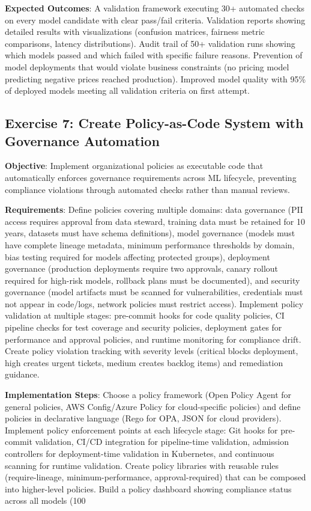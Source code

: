 \textbf{Expected Outcomes}: A validation framework executing 30+ automated checks on every model candidate with clear pass/fail criteria. Validation reports showing detailed results with visualizations (confusion matrices, fairness metric comparisons, latency distributions). Audit trail of 50+ validation runs showing which models passed and which failed with specific failure reasons. Prevention of model deployments that would violate business constraints (no pricing model predicting negative prices reached production). Improved model quality with 95\% of deployed models meeting all validation criteria on first attempt.

\subsection{Exercise 7: Create Policy-as-Code System with Governance Automation}

\textbf{Objective}: Implement organizational policies as executable code that automatically enforces governance requirements across ML lifecycle, preventing compliance violations through automated checks rather than manual reviews.

\textbf{Requirements}: Define policies covering multiple domains: data governance (PII access requires approval from data steward, training data must be retained for 10 years, datasets must have schema definitions), model governance (models must have complete lineage metadata, minimum performance thresholds by domain, bias testing required for models affecting protected groups), deployment governance (production deployments require two approvals, canary rollout required for high-risk models, rollback plans must be documented), and security governance (model artifacts must be scanned for vulnerabilities, credentials must not appear in code/logs, network policies must restrict access). Implement policy validation at multiple stages: pre-commit hooks for code quality policies, CI pipeline checks for test coverage and security policies, deployment gates for performance and approval policies, and runtime monitoring for compliance drift. Create policy violation tracking with severity levels (critical blocks deployment, high creates urgent tickets, medium creates backlog items) and remediation guidance.

\textbf{Implementation Steps}: Choose a policy framework (Open Policy Agent for general policies, AWS Config/Azure Policy for cloud-specific policies) and define policies in declarative language (Rego for OPA, JSON for cloud providers). Implement policy enforcement points at each lifecycle stage: Git hooks for pre-commit validation, CI/CD integration for pipeline-time validation, admission controllers for deployment-time validation in Kubernetes, and continuous scanning for runtime validation. Create policy libraries with reusable rules (require-lineage, minimum-performance, approval-required) that can be composed into higher-level policies. Build a policy dashboard showing compliance status across all models (100%

